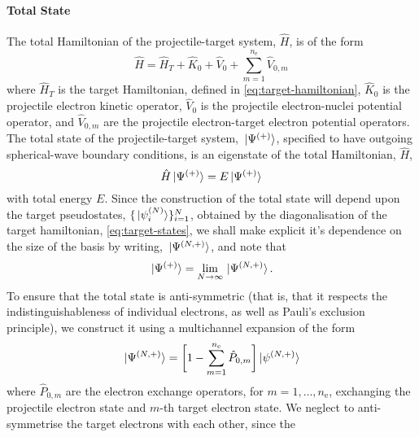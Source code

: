 \documentclass[draft]{article}
\begin{document}
\paragraph{Total State}

The total Hamiltonian of the projectile-target system, $\hat{H}$, is of the form
\begin{equation}
  \label{eq:total-hamiltonian}
  \hat{H}
  =
  \hat{H}_{T}
  +
  \hat{K}_{0}
  +
  \hat{V}_{0}
  +
  \sum_{m = 1}^{n_{\mathrm{e}}}
  \hat{V}_{0, m}
\end{equation}
where $\hat{H}_{T}$ is the target Hamiltonian, defined in
\autoref{eq:target-hamiltonian}, $\hat{K}_{0}$ is the projectile electron
kinetic operator, $\hat{V}_{0}$ is the projectile electron-nuclei potential
operator, and $\hat{V}_{0, m}$ are the projectile electron-target electron
potential operators.
The total state of the projectile-target system, $\ket*{\Psi^{(+)}}$,
specified to have outgoing spherical-wave boundary conditions, is an eigenstate
of the total Hamiltonian, $\hat{H}$,
\begin{equation}
  \label{eq:total-state}
  \hat{H}
  \ket*{\Psi^{\lr{+}}}
  =
  E
  \ket*{\Psi^{\lr{+}}}
\end{equation}
with total energy $E$.
Since the construction of the total state will depend upon the target
pseudostates, $\lbrace\ket*{\psi_{i}^{(N)}}\rbrace_{i = 1}^{N}$, obtained by the
diagonalisation of the target hamiltonian, \autoref{eq:target-states}, we shall
make explicit it's dependence on the size of the basis by writing,
$\ket*{\Psi^{(N, +)}}$, and note that
\begin{equation}
  \label{eq:total-state-expansion}
  \ket*{\Psi^{\lr{+}}}
  =
  \lim_{N \to \infty}
  \ket*{\Psi^{\lr{N, +}}}
  .
\end{equation}
To ensure that the total state is anti-symmetric (that is, that it respects the
indistinguishableness of individual electrons, as well as Pauli's exclusion
principle), we construct it using a multichannel expansion of the form
\begin{equation}
  \label{eq:total-state-multichannel}
  \ket*{\Psi^{\lr{N, +}}}
  =
  \lrsq[\bigg]
  {
    1
    -
    \sum_{m = 1}^{n_{\mathrm{e}}}
    \hat{P}_{0, m}
  }
  \ket*{\psi^{\lr{N, +}}}
\end{equation}
where $\hat{P}_{0, m}$ are the electron exchange operators, for
$m = 1, \dotsc, n_{\mathrm{e}}$, exchanging the projectile electron state and
$m$-th target electron state.
We neglect to anti-symmetrise the target electrons with each other, since the
\end{document}
